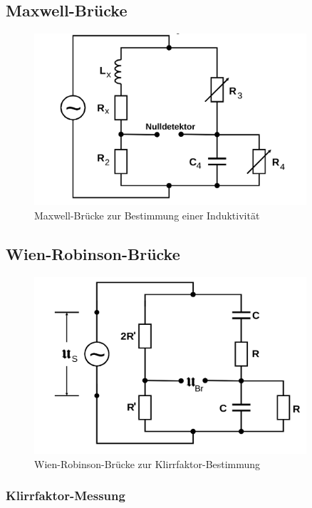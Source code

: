 \subsection{Maxwell-Brücke}
\begin{figure}
  \centering
  \includegraphics[width=0.9\textwidth]{Bilder/maxwell_bruecke.png}
  \caption{Maxwell-Brücke zur Bestimmung einer Induktivität \cite{Anleitung}}
  \label{fig:maxxwellbrücke}
\end{figure}

\subsection{Wien-Robinson-Brücke}
\begin{figure}
  \centering
  \includegraphics[width=0.9\textwidth]{Bilder/wien_robinson_bruecke.png}
  \caption{Wien-Robinson-Brücke zur Klirrfaktor-Bestimmung \cite{Anleitung}}
  \label{fig:wienrobinsonbrücke}
\end{figure}
\blindtext
\subsubsection{Klirrfaktor-Messung}
\blindtext

